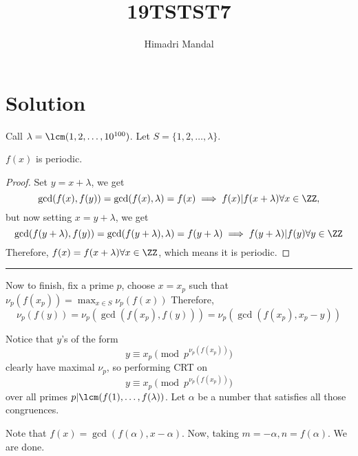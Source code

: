 \documentclass[11pt]{scrartcl}
\title{19TSTST7}
\author{Himadri Mandal}
\begin{document}
\maketitle

\section{Solution}
\begin{soln}
  \raggedright
  Call $\lambda = \lcm(1,2,\dots,10^{100})$. Let $S = \{1,2,\dots,\lambda\}.$ 
  \begin{claim*}
    $f(x)$ is periodic. 
  \end{claim*}
  \begin{proof}
    Set $y = x + \lambda$, we get 
    \[ \gcd(f(x),f(y)) = \gcd(f(x),\lambda) = f(x) \implies f(x) | f(x + \lambda) \forall x \in \ZZ, \]
    but now
    setting $x = y + \lambda$, we get
    \[ \gcd(f(y + \lambda),f(y)) = \gcd(f(y+\lambda),\lambda) = f(y+\lambda) \implies f(y+\lambda)|f(y) \forall y \in \ZZ\]
    Therefore, $f(x) = f(x + \lambda) \forall x \in \ZZ$, which means it is periodic.
  \end{proof}
  
  \hrule

  \bigskip
  Now to finish, fix a prime $p$, choose $x=x_p$ such that $\nu_p(f(x_p)) = \displaystyle\max_{x \in S}\nu_p(f(x))$
  Therefore, 
  \[ \nu_p(f(y)) = \nu_p(\gcd(f(x_p),f(y))) = \nu_p(\gcd(f(x_p),x_p-y))\]
  
  Notice that $y$'s of the form 
  \[ y \equiv x_p \pmod{p^{\nu_p(f(x_p))}} \]
  clearly have maximal $\nu_p$, so performing CRT on 
  \[ y \equiv x_p \pmod{p^{\nu_p(f(x_p))}} \]
  over all primes $p|\lcm(f(1),\dots,f(\lambda))$. Let $\alpha$ be a number that satisfies all those congruences.

  Note that $f(x) = \gcd(f(\alpha),x-\alpha)$. Now, taking $m = -\alpha,n=f(\alpha)$. We are done.
\end{soln}
\end{document}
